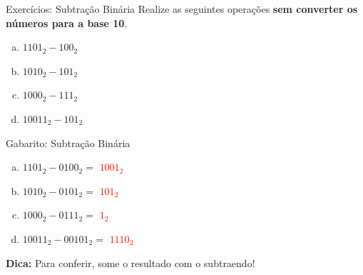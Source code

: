 \begin{frame}{Exercícios: Subtração Binária}
    Realize as seguintes operações \textbf{sem converter os números para a base 10}.


    \begin{enumerate}[a)]
        \item $1101_2 - 100_2$
        \item $1010_2 - 101_2$
        \item $1000_2 - 111_2$
        \item $10011_2 - 101_2$
    \end{enumerate}


    \vspace{0.5cm}


\end{frame}
\begin{frame}{Gabarito: Subtração Binária}


    \begin{enumerate}[a)]
        \item $1101_2 - 0100_2 =$  \textcolor{red}{$1001_2$}


        \item $1010_2 - 0101_2 =$  \textcolor{red}{$101_2$}


        \item $1000_2 - 0111_2 =$  \textcolor{red}{$1_2$}


        \item $10011_2 - 00101_2 =$  \textcolor{red}{$1110_2$}

    \end{enumerate}

    \vspace{0.3cm}
    \centering
    \normalsize
    \textbf{Dica:} Para conferir, some o resultado com o subtraendo!
\end{frame}

